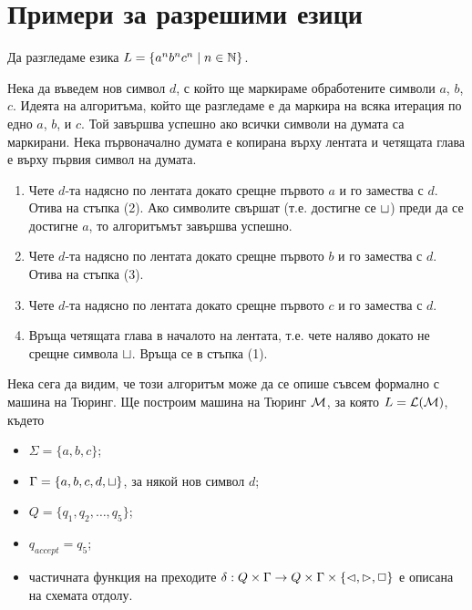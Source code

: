 \section{Примери за разрешими езици}

\begin{example}
  Да разгледаме езика $L = \{a^nb^nc^n \mid n\in\mathbb{N}\}$.
 
  Нека да въведем нов символ $d$, с който ще маркираме обработените символи $a$, $b$, $c$.
  Идеята на алгоритъма, който ще разгледаме е да маркира на всяка итерация по едно $a$, $b$, и $c$.
  Той завършва успешно ако всички символи на думата са маркирани.
  Нека първоначално думата е копирана върху лентата и четящата глава е върху първия символ на думата.
  \begin{enumerate}[(1)]
  \item 
    Чете $d$-та надясно по лентата докато срещне първото $a$ и го замества с $d$. Отива на стъпка (2).
    Ако символите свършат (т.е. достигне се $\sqcup$) преди да се достигне $a$,
    то алгоритъмът завършва успешно.
  \item
    Чете $d$-та надясно по лентата докато срещне първото $b$ и го замества с $d$.
    Отива на стъпка (3).
  \item
    Чете $d$-та надясно по лентата докато срещне първото $c$ и го замества с $d$.
  \item
    Връща четящата глава в началото на лентата, т.е. чете наляво докато не срещне символа $\sqcup$.
    Връща се в стъпка (1). 
  \end{enumerate}

  Нека сега да видим, че този алгоритъм може да се опише съвсем формално с машина на Тюринг.
  Ще построим машина на Тюринг $\mathcal{M}$, за която $L = \mathcal{L}(\mathcal{M})$, където
  \begin{itemize}
  \item 
    $\Sigma = \{a,b,c\}$;
  \item
    $\Gamma = \{a,b,c,d,\sqcup\}$, за някой нов символ $d$;
  \item
    $Q = \{q_1,q_2,\dots,q_5\}$;
  \item
    $q_{accept} = q_5$;
  \item
    частичната функция на преходите $\delta:Q\times\Gamma \to Q\times\Gamma\times\{\lhd,\rhd,\Box\}$
    е описана на схемата отдолу.
  \end{itemize}

  \begin{framed}
  \begin{figure}[H]
    \begin{center}
\end{center}
\end{figure}
\end{framed}
\end{example}

